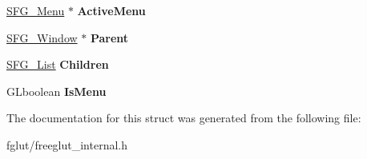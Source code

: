 \begin{DoxyCompactItemize}
\item 
\hyperlink{structtag_s_f_g___menu}{S\+F\+G\+\_\+\+Menu} $\ast$ {\bfseries Active\+Menu}\hypertarget{structtag_s_f_g___window_a4ea3b941e4795d70ffa8cd6c345c5743}{}\label{structtag_s_f_g___window_a4ea3b941e4795d70ffa8cd6c345c5743}

\item 
\hyperlink{structtag_s_f_g___window}{S\+F\+G\+\_\+\+Window} $\ast$ {\bfseries Parent}\hypertarget{structtag_s_f_g___window_a4eacb33b5c31442ba9e12eb55effadf4}{}\label{structtag_s_f_g___window_a4eacb33b5c31442ba9e12eb55effadf4}

\item 
\hyperlink{structtag_s_f_g___list}{S\+F\+G\+\_\+\+List} {\bfseries Children}\hypertarget{structtag_s_f_g___window_a09949beb74c370588f827a0ea3ce5270}{}\label{structtag_s_f_g___window_a09949beb74c370588f827a0ea3ce5270}

\item 
G\+Lboolean {\bfseries Is\+Menu}\hypertarget{structtag_s_f_g___window_aaaff2f620d9c72bb5d16d7ac14d594c8}{}\label{structtag_s_f_g___window_aaaff2f620d9c72bb5d16d7ac14d594c8}

\end{DoxyCompactItemize}


The documentation for this struct was generated from the following file\+:\begin{DoxyCompactItemize}
\item 
fglut/freeglut\+\_\+internal.\+h\end{DoxyCompactItemize}
